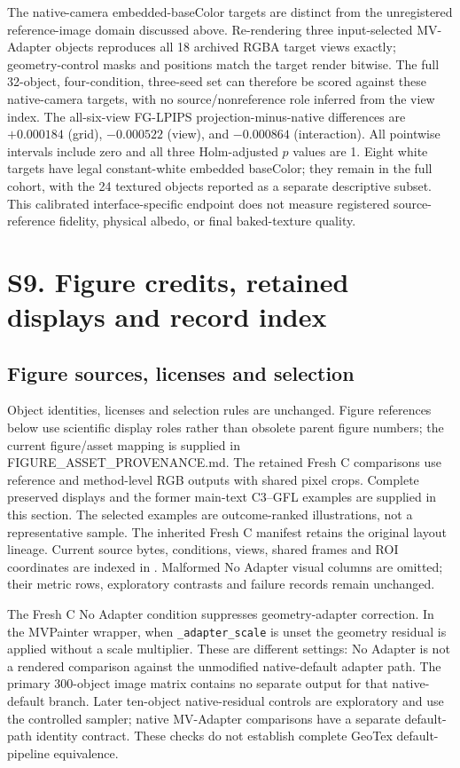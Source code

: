\documentclass[11pt]{article}
\begin{document}
The native-camera embedded-baseColor targets are distinct from the unregistered
reference-image domain discussed above. Re-rendering three input-selected
MV-Adapter objects reproduces all 18 archived RGBA target views exactly;
geometry-control masks and positions match the target render bitwise.
The full 32-object, four-condition, three-seed set can therefore be scored
against these native-camera targets, with no source/nonreference role inferred
from the view index. The all-six-view FG-LPIPS projection-minus-native
differences are $+0.000184$ (grid), $-0.000522$ (view), and $-0.000864$
(interaction). All pointwise intervals include zero and all three Holm-adjusted
$p$ values are 1. Eight white targets have legal constant-white embedded
baseColor; they remain in the full cohort, with the 24 textured objects reported
as a separate descriptive subset. This calibrated interface-specific endpoint
does not measure registered source-reference fidelity, physical albedo, or
final baked-texture quality.

\FloatBarrier
\section*{S9. Figure credits, retained displays and record index}
\label{supp:group9}

\subsection*{Figure sources, licenses and selection}
Object identities, licenses and selection rules are unchanged. Figure references below use scientific display roles rather than obsolete parent figure numbers; the current figure/asset mapping is supplied in FIGURE\_ASSET\_PROVENANCE.md.
The retained Fresh C comparisons use reference and method-level RGB outputs with shared pixel crops. Complete preserved displays and the former main-text C3--GFL examples are supplied in this section. The selected examples are outcome-ranked illustrations, not a representative sample. The inherited Fresh C manifest retains the original layout lineage. Current source bytes, conditions, views, shared frames and ROI coordinates are indexed in . Malformed No Adapter visual columns are omitted; their metric rows, exploratory contrasts and failure records remain unchanged.

The Fresh C No Adapter condition suppresses geometry-adapter correction. In the MVPainter wrapper, when \texttt{\_adapter\_scale} is unset the geometry residual is applied without a scale multiplier. These are different settings: No Adapter is not a rendered comparison against the unmodified native-default adapter path. The primary 300-object image matrix contains no separate output for that native-default branch. Later ten-object native-residual controls are exploratory and use the controlled sampler; native MV-Adapter comparisons have a separate default-path identity contract. These checks do not establish complete GeoTex default-pipeline equivalence.
\end{document}

